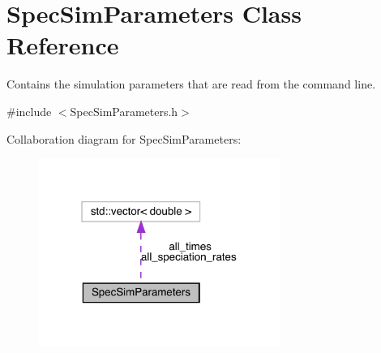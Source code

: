 \hypertarget{struct_spec_sim_parameters}{}\section{Spec\+Sim\+Parameters Class Reference}
\label{struct_spec_sim_parameters}


Contains the simulation parameters that are read from the command line.  




{\ttfamily \#include $<$Spec\+Sim\+Parameters.\+h$>$}



Collaboration diagram for Spec\+Sim\+Parameters\+:
\nopagebreak
\begin{figure}[H]
\begin{center}
\leavevmode
\includegraphics[width=223pt]{struct_spec_sim_parameters__coll__graph}
\end{center}
\end{figure}
